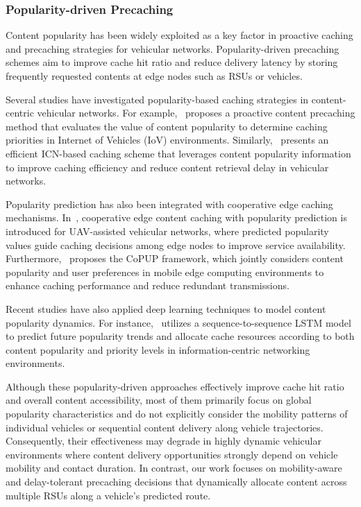 \subsubsection{Popularity-driven Precaching}
\label{subsubsec:rw_popularity_precaching}

Content popularity has been widely exploited as a key factor in proactive caching and precaching strategies for vehicular networks. 
Popularity-driven precaching schemes aim to improve cache hit ratio and reduce delivery latency by storing frequently requested contents at edge nodes such as RSUs or vehicles.

Several studies have investigated popularity-based caching strategies in content-centric vehicular networks. 
For example,~\cite{PopularityValueRetrieval} proposes a proactive content precaching method that evaluates the value of content popularity to determine caching priorities in Internet of Vehicles (IoV) environments. 
Similarly,~\cite{ICNEfficientCaching} presents an efficient ICN-based caching scheme that leverages content popularity information to improve caching efficiency and reduce content retrieval delay in vehicular networks.

Popularity prediction has also been integrated with cooperative edge caching mechanisms. 
In~\cite{UAVEdgeCachingPopularity}, cooperative edge content caching with popularity prediction is introduced for UAV-assisted vehicular networks, where predicted popularity values guide caching decisions among edge nodes to improve service availability. 
Furthermore,~\cite{CoPUP} proposes the CoPUP framework, which jointly considers content popularity and user preferences in mobile edge computing environments to enhance caching performance and reduce redundant transmissions.

Recent studies have also applied deep learning techniques to model content popularity dynamics. 
For instance,~\cite{Seq2SeqPopularityCaching} utilizes a sequence-to-sequence LSTM model to predict future popularity trends and allocate cache resources according to both content popularity and priority levels in information-centric networking environments.

Although these popularity-driven approaches effectively improve cache hit ratio and overall content accessibility, most of them primarily focus on global popularity characteristics and do not explicitly consider the mobility patterns of individual vehicles or sequential content delivery along vehicle trajectories. 
Consequently, their effectiveness may degrade in highly dynamic vehicular environments where content delivery opportunities strongly depend on vehicle mobility and contact duration. 
In contrast, our work focuses on mobility-aware and delay-tolerant precaching decisions that dynamically allocate content across multiple RSUs along a vehicle’s predicted route.





